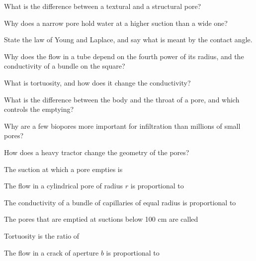 \begin{exlist}
\item What is the difference between a textural and a structural pore?
\item Why does a narrow pore hold water at a higher suction than a wide one?
\item State the law of Young and Laplace, and say what is meant by the contact angle.
\item Why does the flow in a tube depend on the fourth power of its radius, and the conductivity of a bundle on the square?
\item What is tortuosity, and how does it change the conductivity?
\item What is the difference between the body and the throat of a pore, and which controls the emptying?
\item Why are a few biopores more important for infiltration than millions of small pores?
\item How does a heavy tractor change the geometry of the pores?
\end{exlist}

\begin{exlist}
\item The suction at which a pore empties is
\item The flow in a cylindrical pore of radius $r$ is proportional to
\item The conductivity of a bundle of capillaries of equal radius is proportional to
\item The pores that are emptied at suctions below 100 cm are called
\item Tortuosity is the ratio of
\item The flow in a crack of aperture $b$ is proportional to
\end{exlist}
